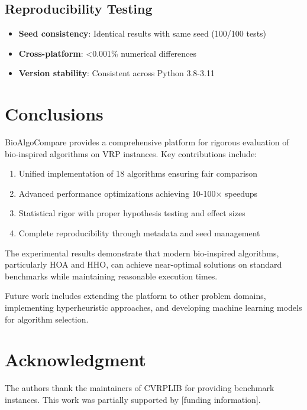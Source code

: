 \documentclass[conference]{IEEEtran}
\begin{document}
\subsection{Reproducibility Testing}

\begin{itemize}
    \item \textbf{Seed consistency}: Identical results with same seed (100/100 tests)
    \item \textbf{Cross-platform}: <0.001\% numerical differences
    \item \textbf{Version stability}: Consistent across Python 3.8-3.11
\end{itemize}

\section{Conclusions}
\label{sec:conclusions}

BioAlgoCompare provides a comprehensive platform for rigorous evaluation of bio-inspired algorithms on VRP instances. Key contributions include:

\begin{enumerate}
    \item Unified implementation of 18 algorithms ensuring fair comparison
    \item Advanced performance optimizations achieving 10-100× speedups
    \item Statistical rigor with proper hypothesis testing and effect sizes
    \item Complete reproducibility through metadata and seed management
\end{enumerate}

The experimental results demonstrate that modern bio-inspired algorithms, particularly HOA and HHO, can achieve near-optimal solutions on standard benchmarks while maintaining reasonable execution times.

Future work includes extending the platform to other problem domains, implementing hyperheuristic approaches, and developing machine learning models for algorithm selection.

\section*{Acknowledgment}

The authors thank the maintainers of CVRPLIB for providing benchmark instances. This work was partially supported by [funding information].



\end{document}
